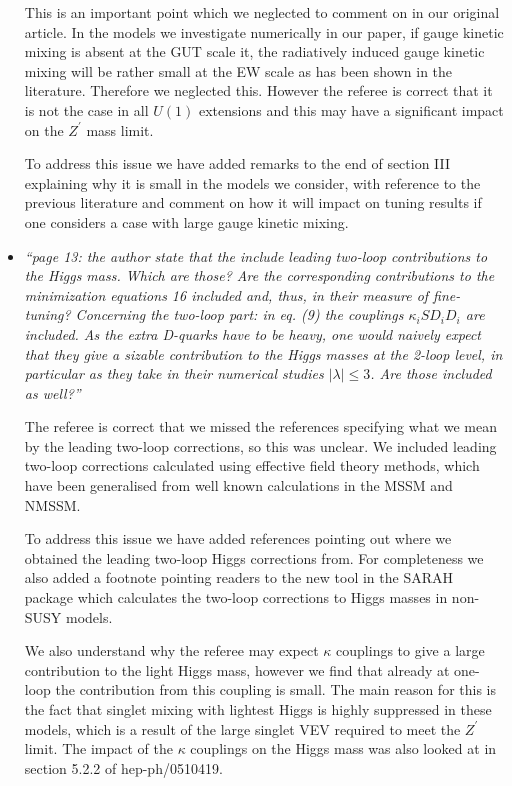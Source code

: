 \documentclass[12pt]{article}
\begin{document}
\begin{itemize}
This is an important point which we neglected to comment on in our
original article.  In the models we investigate numerically in our
paper, if gauge kinetic mixing is absent at the GUT scale it, the
radiatively induced gauge kinetic mixing will be rather small at the
EW scale as has been shown in the literature.  Therefore we neglected
this.  However the referee is correct that it is not the case in all
$U(1)$ extensions and this may have a significant impact on the
$Z^\prime$ mass limit.

To address this issue we have added remarks to the end of section III
explaining why it is small in the models we consider, with reference
to the previous literature and comment on how it will impact on tuning
results if one considers a case with large gauge kinetic mixing.

\item {\it ``page 13: the author state that the include leading
two-loop contributions to the Higgs mass.  Which are those?  Are the
corresponding contributions to the minimization equations 16 included
and, thus, in their measure of fine-tuning?  Concerning the two-loop part:
in eq. (9) the couplings $\kappa_i S D_i D_i$ are included.  As the extra
D-quarks have to be heavy, one would naively expect that they give a
sizable contribution to the Higgs masses at the 2-loop level, in particular
as they take in their numerical studies $|\lambda| \leq 3$.  Are those
included as well?''}

The referee is correct that we missed the references specifying what
we mean by the leading two-loop corrections, so this was unclear.  We
included leading two-loop corrections calculated using effective field
theory methods, which have been generalised from well known
calculations in the MSSM and NMSSM.

To address this issue we have added references pointing out where we
obtained the leading two-loop Higgs corrections from.  For
completeness we also added a footnote pointing readers to the new tool
in the SARAH package which calculates the two-loop corrections to
Higgs masses in non-SUSY models.

We also understand why the referee may expect $\kappa$ couplings to give
a large contribution to the light Higgs mass, however we find that already
at one-loop the contribution from this coupling is small. The main reason
for this is the fact that singlet mixing with lightest Higgs is highly
suppressed in these models, which is a result of the large singlet VEV
required to meet the $Z^\prime$ limit.  The impact of the $\kappa$
couplings on the Higgs mass was also looked at in section 5.2.2 of
hep-ph/0510419.


\end{itemize}
\end{document}
